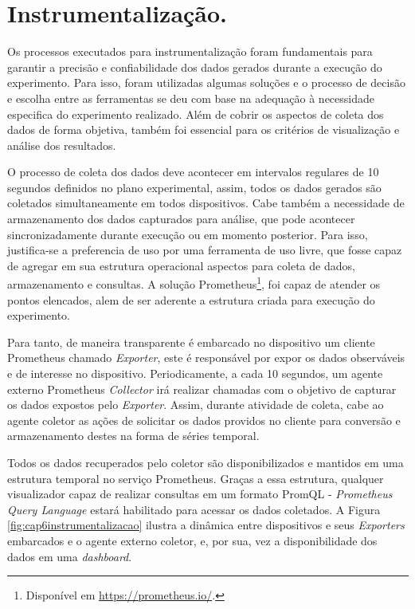 \section{Instrumentalização.}
\label{cap6:instrumentalizacao}
Os processos executados para instrumentalização foram fundamentais para garantir a precisão e confiabilidade dos dados gerados durante a execução do experimento. Para isso, foram utilizadas algumas soluções e o processo de decisão e escolha entre as ferramentas se deu com base na adequação à necessidade especifica do experimento realizado. Além de cobrir os aspectos de coleta dos dados de forma objetiva, também foi essencial para os critérios de visualização e análise dos resultados.

O processo de coleta dos dados deve acontecer em intervalos regulares de 10 segundos definidos no plano experimental, assim, todos os dados gerados são coletados simultaneamente em todos dispositivos. Cabe também a necessidade de armazenamento dos dados capturados para análise, que pode acontecer sincronizadamente durante execução ou em momento posterior. Para isso, justifica-se a preferencia de uso por uma ferramenta de uso livre, que fosse capaz de agregar em sua estrutura operacional aspectos para coleta de dados, armazenamento e consultas. A solução Prometheus\footnote{Disponível em \url{https://prometheus.io/}.}, foi capaz de atender os pontos elencados, alem de ser aderente a estrutura criada para execução do experimento.

Para tanto, de maneira transparente é embarcado no dispositivo um cliente Prometheus chamado \textit{Exporter}, este é responsável por expor os dados observáveis e de interesse no dispositivo. Periodicamente, a cada 10 segundos, um agente externo Prometheus \textit{Collector} irá realizar chamadas com o objetivo de capturar os dados expostos pelo \textit{Exporter}. Assim, durante atividade de coleta, cabe ao agente coletor as ações de solicitar os dados providos no cliente para conversão e armazenamento destes na forma de séries temporal. 

Todos os dados recuperados pelo coletor são disponibilizados e mantidos em uma estrutura temporal no serviço Prometheus. Graças a essa estrutura, qualquer visualizador capaz de realizar consultas em um formato PromQL - \textit{Prometheus Query Language} estará habilitado para acessar os dados coletados. A Figura \ref{fig:cap6instrumentalizacao} ilustra a dinâmica entre dispositivos e seus \textit{Exporters} embarcados e o agente externo coletor, e, por sua, vez a disponibilidade dos dados em uma \textit{dashboard}. 

